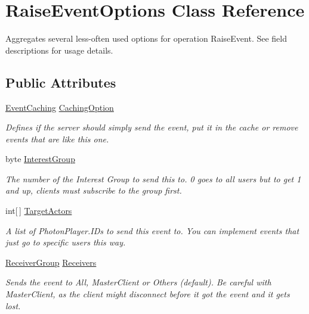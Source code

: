 \hypertarget{class_raise_event_options}{}\section{Raise\+Event\+Options Class Reference}
\label{class_raise_event_options}


Aggregates several less-\/often used options for operation Raise\+Event. See field descriptions for usage details. 


\subsection*{Public Attributes}
\begin{DoxyCompactItemize}
\item 
\hyperlink{namespace_exit_games_1_1_client_1_1_photon_a854484e793ad0027fa7e3245f9858e53}{Event\+Caching} \hyperlink{class_raise_event_options_a4f5d60401abe2561ab71c9ff9290c06b}{Caching\+Option}
\begin{DoxyCompactList}\small\item\em Defines if the server should simply send the event, put it in the cache or remove events that are like this one. \end{DoxyCompactList}\item 
byte \hyperlink{class_raise_event_options_ab9fdfe47e82d2d049a347e7df4cef701}{Interest\+Group}
\begin{DoxyCompactList}\small\item\em The number of the Interest Group to send this to. 0 goes to all users but to get 1 and up, clients must subscribe to the group first.\end{DoxyCompactList}\item 
int\mbox{[}$\,$\mbox{]} \hyperlink{class_raise_event_options_a2efd7020aa43343d1f07a3f8227deb6a}{Target\+Actors}
\begin{DoxyCompactList}\small\item\em A list of Photon\+Player.\+I\+Ds to send this event to. You can implement events that just go to specific users this way.\end{DoxyCompactList}\item 
\hyperlink{namespace_exit_games_1_1_client_1_1_photon_a73fefe1509e4ac1eb48e279422ec82bd}{Receiver\+Group} \hyperlink{class_raise_event_options_a0df0c168fd813e5041f1b0afc6826a75}{Receivers}
\begin{DoxyCompactList}\small\item\em Sends the event to All, Master\+Client or Others (default). Be careful with Master\+Client, as the client might disconnect before it got the event and it gets lost.\end{DoxyCompactList}\item 

\end{DoxyCompactItemize}
